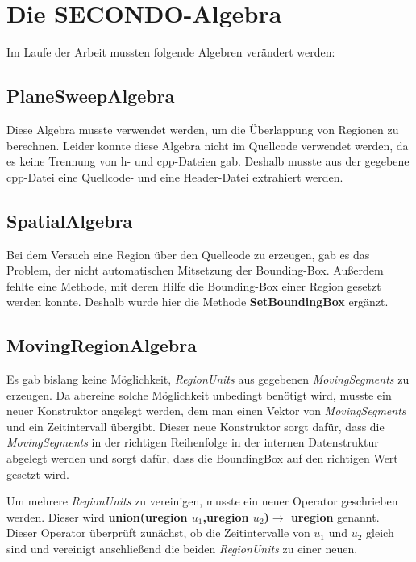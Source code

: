 \section{Die SECONDO-Algebra }\label{rialgebra}

Im Laufe der Arbeit mussten folgende Algebren verändert werden:

\subsection{PlaneSweepAlgebra}

Diese Algebra musste verwendet werden, um die Überlappung von Regionen zu berechnen. Leider konnte diese Algebra nicht im Quellcode verwendet werden, da es keine Trennung von h- und cpp-Dateien gab. Deshalb musste aus der gegebene cpp-Datei eine Quellcode- und eine Header-Datei extrahiert werden.

\subsection{SpatialAlgebra}

Bei dem Versuch eine Region über den Quellcode zu erzeugen, gab es das Problem, der nicht automatischen Mitsetzung der Bounding-Box. Außerdem fehlte eine Methode, mit deren Hilfe die Bounding-Box einer Region gesetzt werden konnte. Deshalb wurde hier die Methode \textbf{SetBoundingBox} ergänzt.

\subsection{MovingRegionAlgebra}

Es gab bislang keine Möglichkeit, \textit{RegionUnits} aus gegebenen \textit{MovingSegments} zu erzeugen. Da abereine solche Möglichkeit  unbedingt  benötigt wird, musste ein neuer Konstruktor angelegt werden, dem man einen Vektor von \textit{MovingSegments} und ein Zeitintervall übergibt. Dieser neue Konstruktor sorgt dafür, dass die \textit{MovingSegments} in der richtigen Reihenfolge in der internen Datenstruktur abgelegt werden und sorgt dafür, dass die BoundingBox auf den richtigen Wert gesetzt wird.

Um mehrere \textit{RegionUnits} zu vereinigen, musste ein neuer Operator geschrieben werden. Dieser wird \textbf{union(uregion $u_1$,uregion $u_2$)$\rightarrow$ uregion} genannt. Dieser Operator überprüft zunächst, ob die Zeitintervalle von $u_1$ und $u_2$ gleich sind und vereinigt anschließend die beiden \textit{RegionUnits} zu einer neuen.

